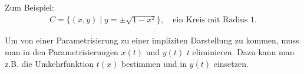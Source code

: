 \documentclass[12pt]{article}
\newenvironment{definition}[2][Definition]{\begin{trivlist}
        \item[\hskip \labelsep {\bfseries #1}\hskip \labelsep {\bfseries #2.}]}{\flushright{$\square$}\end{trivlist}}
\newenvironment{remark}[2][Bemerkung]{\begin{trivlist}
        \item[\hskip \labelsep {\bfseries #1}\hskip \labelsep {\bfseries #2.}]}{\end{trivlist}}
\begin{document}
\begin{definition}{[Ebene Kurven]}
\begin{enumerate}
                      Zum Beispiel:
                      \begin{align*}
                              C=\{(x,y)\mid y=\pm\sqrt{1-x^2}\}, \quad \text{ein Kreis mit Radius 1.}
                      \end{align*}
                      \begin{figure}[hbt!]
                              \centering
                              \begin{subfigure}[][][]{0.45\textwidth}
                                      \centering
                              \end{subfigure}
                              \begin{subfigure}[][][]{0.45\textwidth}
                                      \centering
                              \end{subfigure}
                      \end{figure}
        \end{enumerate}
        \begin{remark}{[Von Parametrisierung zu impliziten Darstellung]}
                Um von einer Parametrisierung zu einer impliziten Darstellung zu kommen, muss man in den Parametrisierungen $x(t)$ und $y(t)$ $t$ eliminieren. Dazu kann man z.B. die Umkehrfunktion $t(x)$ bestimmen und in $y(t)$ einsetzen.
        \end{remark}
\end{definition}
\end{document}
